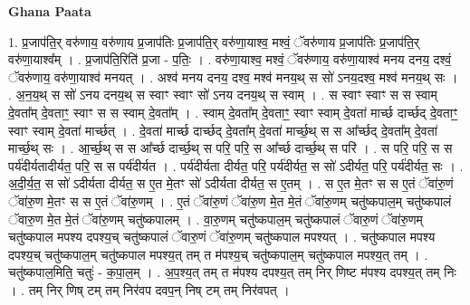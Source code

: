 \documentclass[17pt]{extarticle}
\begin{document}
\textbf{Ghana Paata } \newline

1. प्र॒जाप॑ति॒र् वरु॑णाय॒ वरु॑णाय प्र॒जाप॑तिः प्र॒जाप॑ति॒र् वरु॑णा॒याश्व॒ मश्वं॒ ॅवरु॑णाय प्र॒जाप॑तिः प्र॒जाप॑ति॒र् वरु॑णा॒याश्व᳚म् । . प्र॒जाप॑ति॒रिति॑ प्र॒जा - प॒तिः॒ । . वरु॑णा॒याश्व॒ मश्वं॒ ॅवरु॑णाय॒ वरु॑णा॒याश्व॑ मनय दनय॒ दश्वं॒ ॅवरु॑णाय॒ वरु॑णा॒याश्व॑ मनयत् । . अश्व॑ मनय दनय॒ दश्व॒ मश्व॑ मनय॒थ् स सो॑ ऽनय॒दश्व॒ मश्व॑ मनय॒थ् सः । . अ॒न॒य॒थ् स सो॑ ऽनय दनय॒थ् स स्वाꣳ स्वाꣳ सो॑ ऽनय दनय॒थ् स स्वाम् । . स स्वाꣳ स्वाꣳ स स स्वाम् दे॒वता᳚म् दे॒वताꣳ॒॒ स्वाꣳ स स स्वाम् दे॒वता᳚म् । . स्वाम् दे॒वता᳚म् दे॒वताꣳ॒॒ स्वाꣳ स्वाम् दे॒वता॑ मार्च्छ दार्च्छद् दे॒वताꣳ॒॒ स्वाꣳ स्वाम् दे॒वता॑ मार्च्छत् । . दे॒वता॑ मार्च्छ दार्च्छद् दे॒वता᳚म् दे॒वता॑ मार्च्छ॒थ् स स आ᳚र्च्छद् दे॒वता᳚म् दे॒वता॑ मार्च्छ॒थ् सः । . आ॒र्च्छ॒थ् स स आ᳚र्च्छ दार्च्छ॒थ् स परि॒ परि॒ स आ᳚र्च्छ दार्च्छ॒थ् स परि॑ । . स परि॒ परि॒ स स पर्य॑दीर्यतादीर्यत॒ परि॒ स स पर्य॑दीर्यत । . पर्य॑दीर्यता दीर्यत॒ परि॒ पर्य॑दीर्यत॒ स सो॑ ऽदीर्यत॒ परि॒ पर्य॑दीर्यत॒ सः । . अ॒दी॒र्य॒त॒ स सो॑ ऽदीर्यता दीर्यत॒ स ए॒त मे॒तꣳ सो॑ ऽदीर्यता दीर्यत॒ स ए॒तम् । . स ए॒त मे॒तꣳ स स ए॒तं ॅवा॑रु॒णं ॅवा॑रु॒ण मे॒तꣳ स स ए॒तं ॅवा॑रु॒णम् । . ए॒तं ॅवा॑रु॒णं ॅवा॑रु॒ण मे॒त मे॒तं ॅवा॑रु॒णम् चतु॑ष्कपाल॒म् चतु॑ष्कपालं ॅवारु॒ण मे॒त मे॒तं ॅवा॑रु॒णम् चतु॑ष्कपालम् । . वा॒रु॒णम् चतु॑ष्कपाल॒म् चतु॑ष्कपालं ॅवारु॒णं ॅवा॑रु॒णम् चतु॑ष्कपाल मपश्य दपश्य॒च् चतु॑ष्कपालं ॅवारु॒णं ॅवा॑रु॒णम् चतु॑ष्कपाल मपश्यत् । . चतु॑ष्कपाल मपश्य दपश्य॒च् चतु॑ष्कपाल॒म् चतु॑ष्कपाल मपश्य॒त् तम् त म॑पश्य॒च् चतु॑ष्कपाल॒म् चतु॑ष्कपाल मपश्य॒त् तम् । . चतु॑ष्कपाल॒मिति॒ चतुः॑ - क॒पा॒ल॒म् । . अ॒प॒श्य॒त् तम् त म॑पश्य दपश्य॒त् तम् निर् णिष्ट म॑पश्य दपश्य॒त् तम् निः । . तम् निर् णिष् टम् तम् निर॑वप दवप॒न् निष् टम् तम् निर॑वपत् । \newline
\end{document}
